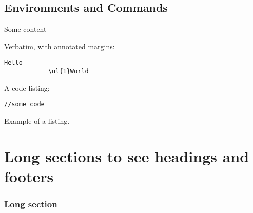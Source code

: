 \documentclass[a4paper,12pt,fleqn,twoside,openright,style=phpro]{yapbook}
\begin{document}
        \chapter{Environments and Commands}


            \begin{Exercise*}[title={This is an Exercise},difficulty=1]

            \ExePart

            Some content

            \end{Exercise*}

            Verbatim, with annotated margins:

            \begin{Verbatim}[commandchars=\\\{\}]
            Hello
            \nl{1}World
            \end{Verbatim}

            A code listing:

            \begin{lstlisting}[caption={This is the title}]
            //some code
            \end{lstlisting}

            \begin{listing}[H]
                \caption{Example of a listing.}
            \end{listing}



    \part{Long sections to see headings and footers}

        \section{Long section}

        \lipsum
        \lipsum
        \lipsum

\end{document}
